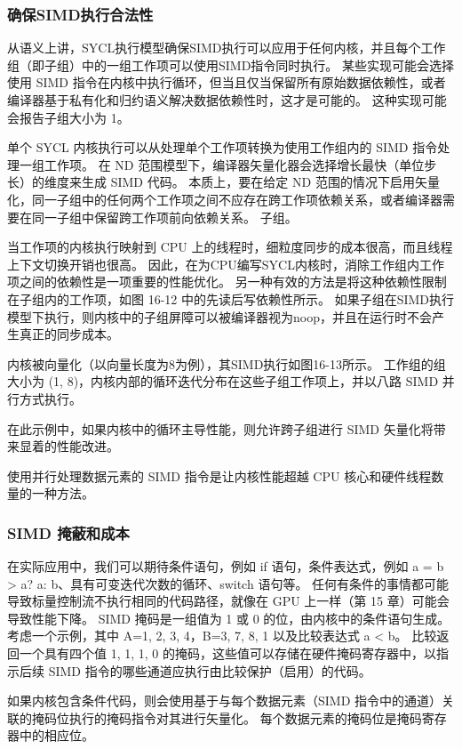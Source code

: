 \subsubsection{确保SIMD执行合法性}
从语义上讲，SYCL执行模型确保SIMD执行可以应用于任何内核，并且每个工作组（即子组）中的一组工作项可以使用SIMD指令同时执行。 某些实现可能会选择使用 SIMD 指令在内核中执行循环，但当且仅当保留所有原始数据依赖性，或者编译器基于私有化和归约语义解决数据依赖性时，这才是可能的。 这种实现可能会报告子组大小为 1。

单个 SYCL 内核执行可以从处理单个工作项转换为使用工作组内的 SIMD 指令处理一组工作项。 在 ND 范围模型下，编译器矢量化器会选择增长最快（单位步长）的维度来生成 SIMD 代码。 本质上，要在给定 ND 范围的情况下启用矢量化，同一子组中的任何两个工作项之间不应存在跨工作项依赖关系，或者编译器需要在同一子组中保留跨工作项前向依赖关系。 子组。

当工作项的内核执行映射到 CPU 上的线程时，细粒度同步的成本很高，而且线程上下文切换开销也很高。 因此，在为CPU编写SYCL内核时，消除工作组内工作项之间的依赖性是一项重要的性能优化。 另一种有效的方法是将这种依赖性限制在子组内的工作项，如图 16-12 中的先读后写依赖性所示。 如果子组在SIMD执行模型下执行，则内核中的子组屏障可以被编译器视为noop，并且在运行时不会产生真正的同步成本。

内核被向量化（以向量长度为8为例），其SIMD执行如图16-13所示。 工作组的组大小为 (1, 8)，内核内部的循环迭代分布在这些子组工作项上，并以八路 SIMD 并行方式执行。

在此示例中，如果内核中的循环主导性能，则允许跨子组进行 SIMD 矢量化将带来显着的性能改进。

使用并行处理数据元素的 SIMD 指令是让内核性能超越 CPU 核心和硬件线程数量的一种方法。

\subsubsection{SIMD 掩蔽和成本}
在实际应用中，我们可以期待条件语句，例如 if 语句，条件表达式，例如 a = b > a? a: b、具有可变迭代次数的循环、switch 语句等。 任何有条件的事情都可能导致标量控制流不执行相同的代码路径，就像在 GPU 上一样（第 15 章）可能会导致性能下降。 SIMD 掩码是一组值为 1 或 0 的位，由内核中的条件语句生成。 考虑一个示例，其中 A={1, 2, 3, 4}，B={3, 7, 8, 1} 以及比较表达式 a < b。 比较返回一个具有四个值 {1, 1, 1, 0} 的掩码，这些值可以存储在硬件掩码寄存器中，以指示后续 SIMD 指令的哪些通道应执行由比较保护（启用）的代码。

如果内核包含条件代码，则会使用基于与每个数据元素（SIMD 指令中的通道）关联的掩码位执行的掩码指令对其进行矢量化。 每个数据元素的掩码位是掩码寄存器中的相应位。

